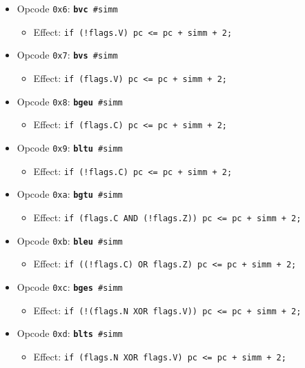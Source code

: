 \documentclass{article}
\begin{document}
\begin{itemize}
		\item Opcode \texttt{0x6}:
			\texttt{\textbf{bvc} \#simm}
		\begin{itemize}
			\item Effect:
				\texttt{if (!flags.V) pc <= pc + simm + 2;}
		\end{itemize}

		\item Opcode \texttt{0x7}:
			\texttt{\textbf{bvs} \#simm}
		\begin{itemize}
			\item Effect:
				\texttt{if (flags.V) pc <= pc + simm + 2;}
		\end{itemize}

		\item Opcode \texttt{0x8}:
			\texttt{\textbf{bgeu} \#simm}
		\begin{itemize}
			\item Effect:
				\texttt{if (flags.C) pc <= pc + simm + 2;}
		\end{itemize}

		\item Opcode \texttt{0x9}:
			\texttt{\textbf{bltu} \#simm}
		\begin{itemize}
			\item Effect:
				\texttt{if (!flags.C) pc <= pc + simm + 2;}
		\end{itemize}

		\item Opcode \texttt{0xa}:
			\texttt{\textbf{bgtu} \#simm}
		\begin{itemize}
			\item Effect:
				\texttt{if (flags.C AND (!flags.Z)) pc <= pc + simm + 2;}
		\end{itemize}

		\item Opcode \texttt{0xb}:
			\texttt{\textbf{bleu} \#simm}
		\begin{itemize}
			\item Effect:
				\texttt{if ((!flags.C) OR flags.Z) pc <= pc + simm + 2;}
		\end{itemize}

		\item Opcode \texttt{0xc}:
			\texttt{\textbf{bges} \#simm}
		\begin{itemize}
			\item Effect:
				\texttt{if (!(flags.N XOR flags.V)) pc <= pc + simm + 2;}
		\end{itemize}

		\item Opcode \texttt{0xd}:
			\texttt{\textbf{blts} \#simm}
		\begin{itemize}
			\item Effect:
				\texttt{if (flags.N XOR flags.V) pc <= pc + simm + 2;}
		\end{itemize}


\end{itemize}
\end{document}
